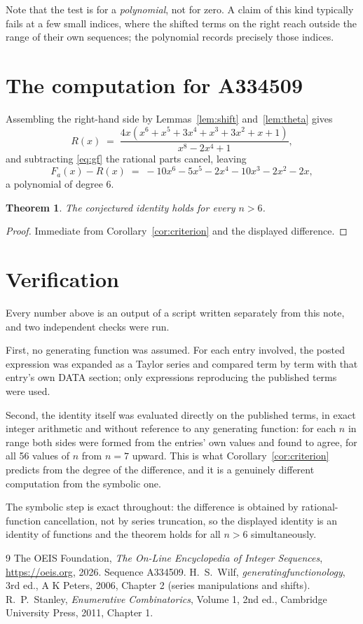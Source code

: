 \documentclass[11pt,a4paper]{article}
\theoremstyle{plain}
\newtheorem{theorem}{Theorem}
\theoremstyle{definition}
\begin{document}
Note that the test is for a \emph{polynomial}, not for zero. A claim of this kind
typically fails at a few small indices, where the shifted terms on the right reach outside
the range of their own sequences; the polynomial records precisely those indices.

\section{The computation for A334509}

Assembling the right-hand side by Lemmas~\ref{lem:shift} and~\ref{lem:theta} gives
\[
R(x)\;=\;\frac{4 x \left(x^{6} + x^{5} + 3 x^{4} + x^{3} + 3 x^{2} + x + 1\right)}{x^{8} - 2 x^{4} + 1} ,
\]
and subtracting \eqref{eq:gf} the rational parts cancel, leaving
\[
F_{a}(x)-R(x)\;=\;- 10 x^{6} - 5 x^{5} - 2 x^{4} - 10 x^{3} - 2 x^{2} - 2 x ,
\]
a polynomial of degree $6$.

\begin{theorem}
The conjectured identity holds for every $n>6$.
\end{theorem}

\begin{proof}
Immediate from Corollary~\ref{cor:criterion} and the displayed difference.
\end{proof}

\section{Verification}

Every number above is an output of a script written separately from this note, and two
independent checks were run.

First, no generating function was assumed. For each entry involved, the posted expression
was expanded as a Taylor series and compared term by term with that entry's own DATA
section; only expressions reproducing the published terms were used.

Second, the identity itself was evaluated directly on the published terms, in exact
integer arithmetic and without reference to any generating function: for each $n$ in range
both sides were formed from the entries' own values and found to agree, for all 56
values of $n$ from $n=7$ upward. This is what Corollary~\ref{cor:criterion}
predicts from the degree of the difference, and it is a genuinely different computation
from the symbolic one.

The symbolic step is exact throughout: the difference is obtained by rational-function
cancellation, not by series truncation, so the displayed identity is an identity of
functions and the theorem holds for all $n>6$ simultaneously.

\begin{thebibliography}{9}
 The OEIS Foundation, \emph{The On-Line Encyclopedia of Integer Sequences},
\url{https://oeis.org}, 2026. Sequence A334509.
 H.~S.~Wilf, \emph{generatingfunctionology}, 3rd ed., A K Peters, 2006,
Chapter 2 (series manipulations and shifts).
 R.~P.~Stanley, \emph{Enumerative Combinatorics}, Volume 1, 2nd ed.,
Cambridge University Press, 2011, Chapter 1.
\end{thebibliography}
\end{document}
